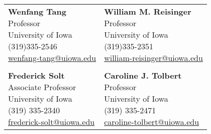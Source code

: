\documentclass[10.5pt,]{article}
\begin{document}
\begin{tabular}{ll}
\parbox{5cm}{\textbf{Wenfang Tang}\\Professor\\University of Iowa\\(319)335-2546\\\href{mailto:wenfang-tang@uiowa.edu}{wenfang-tang@uiowa.edu}}
 &\parbox{5cm}{\textbf{William M. Reisinger}\\Professor\\University of Iowa\\(319)335-2351\\\href{mailto:william-reisinger@uiowa.edu}{william-reisinger@uiowa.edu}}\\
&\\
\parbox{5cm}{\textbf{Frederick Solt}\\Associate Professor\\University of Iowa\\(319) 335-2340\\\href{mailto:frederick-solt@uiowa.edu}{frederick-solt@uiowa.edu}}
 &\parbox{5cm}{\textbf{Caroline J. Tolbert}\\Professor\\University of Iowa\\(319) 335-2471\\\href{caroline-tolbert@uiowa.edu}{caroline-tolbert@uiowa.edu}}\\
\end{tabular}
	
			
\end{document}
